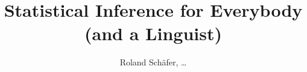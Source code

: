 \author{Roland Schäfer, \ldots}
\title{Statistical Inference for Everybody (and a Linguist)}
\subtitle{}
\renewcommand{\lsSeries}{tbls}
\renewcommand{\lsSeriesNumber}{}


\def\lsBookDOI{}
\def\lsISBNhardcover{}
\def\lsISBNsoftcover{}
\def\lsISBNdigital{}
\def\lsID{}

\dedication{\texttt{[image: images/schaefer]}\\\footnotesize \textbf{Roland Schäfer} in a picture that means that readers will have to calculate everything by hand.}
